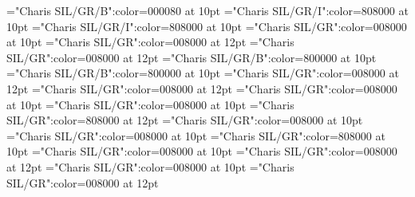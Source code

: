 \documentclass[a4paper,twoside]{article}
\begin{document}
\font\spanmxbcaptioncaptionContentpictureentryletDatadicBody="Charis SIL/GR/B":color=000080 at 10pt
\font\comentariorestrictivosensesensecontentsensesentryletDatadicBody="Charis SIL/GR/I":color=808000 at 10pt
\font\spancomentariorestrictivosensesensecontentsensesentryletDatadicBody="Charis SIL/GR/I":color=808000 at 10pt
\font\spanescomentariorestrictivosensesensecontentsensesentryletDatadicBody="Charis SIL/GR":color=008000 at 10pt
\font\mainentrysubsensessensessensesensecontentsensesentryletDatadicBody="Charis SIL/GR":color=008000 at 12pt
\font\sensecontentmainentrysubsensessensessensesensecontentsensesentryletDatadicBody="Charis SIL/GR":color=008000 at 12pt
\font\sensenumbersensecontentmainentrysubsensessensessensesensecontentsensesentryletDatadicBody="Charis SIL/GR/B":color=800000 at 10pt
\font\spansensenumbersensecontentmainentrysubsensessensessensesensecontentsensesentryletDatadicBody="Charis SIL/GR/B":color=800000 at 10pt
\font\mainentrysubsensesensesensecontentmainentrysubsensessensessensesensecontentsensesentryletDatadicBody="Charis SIL/GR":color=008000 at 12pt
\font{}="Charis SIL/GR":color=008000 at 12pt
\font\spanesdefinitionorglossmainentrysubsensesensesensecontentmainentrysubsensessensessensesensecontentsensesentryletDatadicBody="Charis SIL/GR":color=008000 at 10pt
\font\spandefinitionorglossmainentrysubsensesensesensecontentmainentrysubsensessensessensesensecontentsensesentryletDatadicBody="Charis SIL/GR":color=008000 at 10pt
\font\restrictionsmainentrysubsensesensesensecontentmainentrysubsensessensessensesensecontentsensesentryletDatadicBody="Charis SIL/GR":color=808000 at 12pt
\font\spanesrestrictionsmainentrysubsensesensesensecontentmainentrysubsensessensessensesensecontentsensesentryletDatadicBody="Charis SIL/GR":color=008000 at 10pt
\font\spanspanesrestrictionsmainentrysubsensesensesensecontentmainentrysubsensessensessensesensecontentsensesentryletDatadicBody="Charis SIL/GR":color=008000 at 10pt
\font\spanrestrictionsmainentrysubsensesensesensecontentmainentrysubsensessensessensesensecontentsensesentryletDatadicBody="Charis SIL/GR":color=808000 at 10pt
\font\spansensecontentmainentrysubsensessensessensesensecontentsensesentryletDatadicBody="Charis SIL/GR":color=008000 at 10pt
\font\variantformentrybackrefsentryletDatadicBody="Charis SIL/GR":color=008000 at 12pt
\font\spanvariantformentrybackrefsentryletDatadicBody="Charis SIL/GR":color=008000 at 10pt
\font\variantformentrybackrefvariantformentrybackrefsentryletDatadicBody="Charis SIL/GR":color=008000 at 12pt
\end{document}
